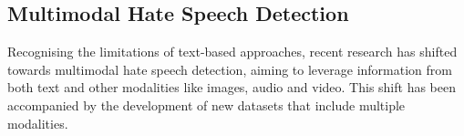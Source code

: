 
\subsection{Multimodal Hate Speech Detection}
Recognising the limitations of text-based approaches, recent research has shifted towards multimodal hate speech detection, aiming to leverage information from both text and other modalities like images, audio and video. This shift has been accompanied by the development of new datasets that include multiple modalities.

